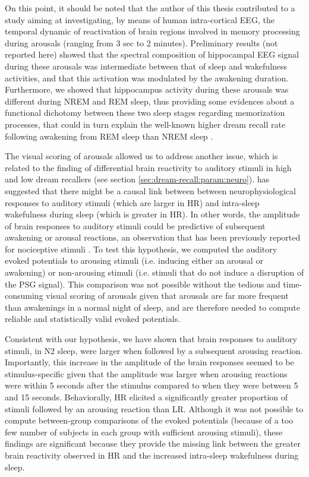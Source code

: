 On this point, it should be noted that the author of this thesis contributed to a study aiming at investigating, by means of human intra-cortical EEG, the temporal dynamic of reactivation of brain regions involved in memory processing during arousals (ranging from 3 sec to 2 minutes). Preliminary results (not reported here) showed that the spectral composition of hippocampal EEG signal during these arousals was intermediate between that of sleep and wakefulness activities, and that this activation was modulated by the awakening duration. Furthermore, we showed that hippocampus activity during these arousals was different during NREM and REM sleep, thus providing some evidences about a functional dichotomy between these two sleep stages regarding memorization processes, that could in turn explain the well-known higher dream recall rate following awakening from REM sleep than NREM sleep \citep{nielsen_review_2000}.

The visual scoring of arousals allowed us to address another issue, which is related to the finding of differential brain reactivity to auditory stimuli in high and low dream recallers (see section \ref{sec:dream-recall:param:neuro}). \citet{eichenlaub_brain_2014} has suggested that there might be a causal link between between neurophysiological responses to auditory stimuli (which are larger in HR) and intra-sleep wakefulness during sleep (which is greater in HR). In other words, the amplitude of brain responses to auditory stimuli could be predictive of subsequent awakening or arousal reactions, an observation that has been previously reported for nociceptive stimuli \citet{bastuji_laser_2008}. To test this hypothesis, we computed the auditory evoked potentials to arousing stimuli (i.e. inducing either an arousal or awakening) or non-arousing stimuli (i.e. stimuli that do not induce a disruption of the PSG signal). This comparison was not possible without the tedious and time-consuming visual scoring of arousals given that arousals are far more frequent than awakenings in a normal night of sleep, and are therefore needed to compute reliable and statistically valid evoked potentials.

Consistent with our hypothesis, we have shown that brain responses to auditory stimuli, in N2 sleep, were larger when followed by a subsequent arousing reaction. Importantly, this increase in the amplitude of the brain responses seemed to be stimulus-specific given that the amplitude was larger when arousing reactions were within 5 seconds after the stimulus compared to when they were between 5 and 15 seconds. Behaviorally, HR elicited a significantly greater proportion of stimuli followed by an arousing reaction than LR. Although it was not possible to compute between-group comparisons of the evoked potentials (because of a too few number of subjects in each group with sufficient arousing stimuli), these findings are significant because they provide the missing link between the greater brain reactivity observed in HR and the increased intra-sleep wakefulness during sleep.

